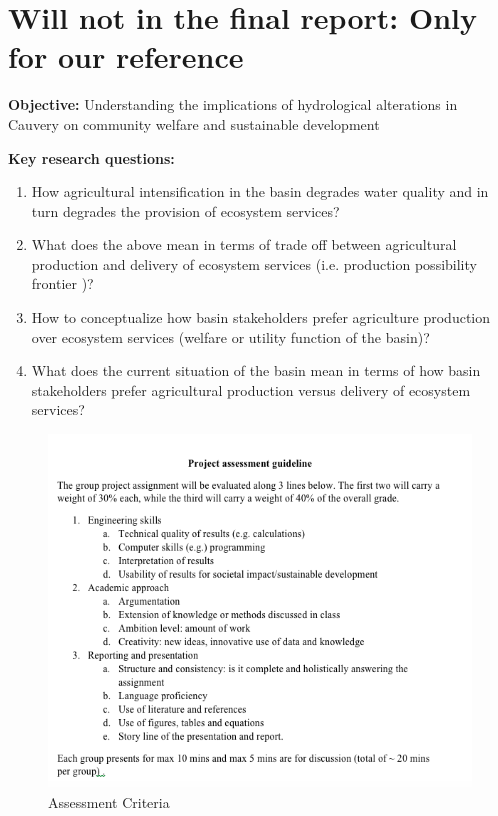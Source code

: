 \section{Will not in the final report: Only for our reference}

\textbf{Objective:} Understanding the implications of hydrological alterations in Cauvery on community welfare and sustainable development

\textbf{Key research questions: }
\begin{enumerate}
    \item How agricultural intensification in the basin degrades water quality and in turn degrades  the provision of ecosystem services?
    \item What does the above mean in terms of trade off between agricultural production and delivery of ecosystem services (i.e. production possibility frontier )?
    \item How to conceptualize how basin stakeholders prefer agriculture  production over ecosystem services (welfare or utility function of the basin)?
    \item What does the current situation of the basin mean in terms of how basin stakeholders prefer agricultural production versus  delivery of ecosystem services?
    
\end{enumerate}

\begin{figure}[H]
    \centering
    \includegraphics[scale = 0.8]{Not_Used_EXTRA/Assessment.png}
    \caption{Assessment Criteria}
    \label{fig:AC}
\end{figure}

